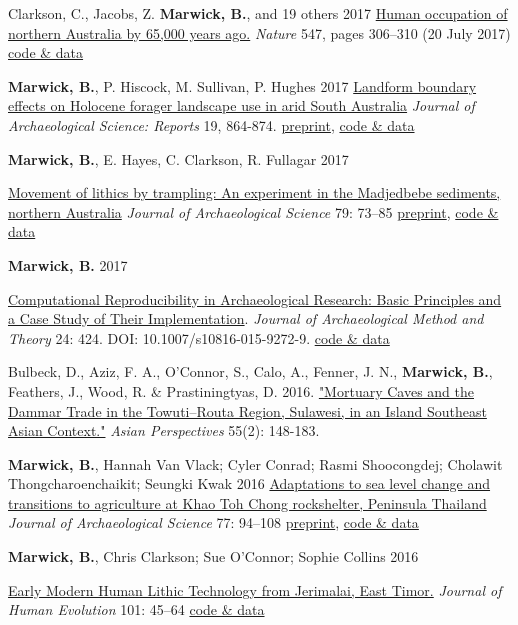 \documentclass[11pt,article,oneside]{memoir}
\begin{document}
\ind  Clarkson, C., Jacobs, Z. \textbf{Marwick, B.}, and 19 others 2017 \href{http://dx.doi.org/10.1038/nature22968}{Human occupation of northern Australia by 65,000 years ago.} \textit{Nature} 547, pages 306–310 (20 July 2017) \href{https://doi.org/10.17605/OSF.IO/QWFCZ}{code \& data}

\ind  \textbf{Marwick, B.}, P. Hiscock, M. Sullivan, P. Hughes 2017 \href{http://doi.org/10.1016/j.jasrep.2017.07.004}{Landform boundary effects on Holocene forager landscape use in arid South Australia} \textit{Journal of Archaeological Science: Reports} 19, 864-874. \href{https://doi.org/10.17605/OSF.IO/V2MS9}{preprint}, \href{https://doi.org/10.17605/OSF.IO/EDZXS}{code \& data}

\ind  \textbf{Marwick, B.}, E. Hayes, C. Clarkson, R. Fullagar 2017 {\href{https://doi.org/10.1016/j.jas.2017.01.008}{Movement of lithics by trampling: An experiment in the Madjedbebe sediments, northern Australia} \textit{Journal of Archaeological Science}  79: 73–85 \href{https://doi.org/10.17605/OSF.IO/V2MS9}{preprint}, \href{https://doi.org/10.17605/OSF.IO/EDZXS}{code \& data}

\ind \textbf{Marwick, B.} 2017 {\href{http://dx.doi.org/10.1007/s10816-015-9272-9}{Computational Reproducibility in Archaeological Research: Basic Principles and a Case Study of Their Implementation}. \textit{Journal of Archaeological Method and Theory} 24: 424. DOI: 10.1007/s10816-015-9272-9. \href{https://doi.org/10.6084/m9.figshare.1563661}{code \& data}

\ind  Bulbeck, D., Aziz, F. A.,  O'Connor, S.,  Calo, A., Fenner, J. N., \textbf{Marwick, B.},  Feathers, J.,  Wood, R. \& Prastiningtyas, D. 2016. \href{http://dx.doi.org/10.1353/asi.2016.0017}{"Mortuary Caves and the Dammar Trade in the Towuti–Routa Region, Sulawesi, in an Island Southeast Asian Context."} \textit{Asian Perspectives} 55(2): 148-183.

\ind  \textbf{Marwick, B.}, Hannah Van Vlack; Cyler Conrad; Rasmi Shoocongdej; \newline Cholawit Thongcharoenchaikit; Seungki Kwak 2016 \href{http://dx.doi.org/10.1016/j.jas.2016.10.010}{Adaptations to sea level change and transitions to agriculture at Khao Toh Chong rockshelter, Peninsula Thailand} \textit{Journal of Archaeological Science} 77: 94–108 \href{https://osf.io/preprints/socarxiv/axxf8/}{preprint}, \href{https://dx.doi.org/10.6084/m9.figshare.2065602}{code \& data}

\ind  \textbf{Marwick, B.}, Chris Clarkson; Sue O'Connor; Sophie Collins 2016 {\href{http://dx.doi.org/10.1016/j.jhevol.2016.09.004}{Early Modern Human Lithic Technology from Jerimalai, East Timor.} \textit{Journal of Human Evolution} 101: 45–64 \href{http://dx.doi.org/10.6084/m9.figshare.985406}{code \& data}

}}}
\end{document}
